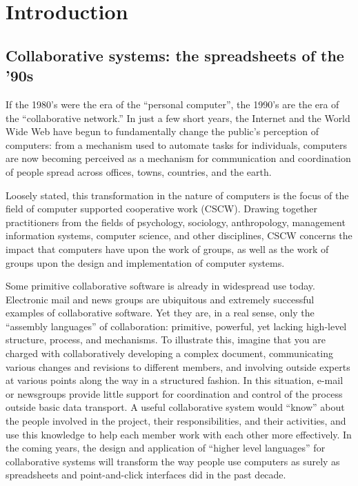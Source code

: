 
\chapter{Introduction}

\section{Collaborative systems: the spreadsheets of the '90s}

If the 1980's were the era of the ``personal computer'', the 1990's are the
era of the ``collaborative network.''  In just a few short years, the
Internet and the World Wide Web have begun to fundamentally change the
public's perception of computers: from a mechanism used to automate tasks
for individuals, computers are now becoming perceived as a mechanism for 
communication and coordination of people spread across offices,
towns, countries, and the earth.

Loosely stated, this transformation in the nature of computers is the focus
of the field of computer supported cooperative work (CSCW). Drawing
together practitioners from the fields of psychology, sociology,
anthropology, management information systems, computer science, and other
disciplines, CSCW concerns the impact that computers have upon the work of
groups, as well as the work of groups upon the design and implementation of
computer systems.  

Some primitive collaborative software is already in widespread use today.
Electronic mail and news groups are ubiquitous and extremely successful
examples of collaborative software.  Yet they are, in a real sense, only
the ``assembly languages'' of collaboration: primitive, powerful, yet
lacking high-level structure, process, and mechanisms.  To illustrate this,
imagine that you are charged with collaboratively developing a complex
document, communicating various changes and revisions to different members,
and involving outside experts at various points along the way in a
structured fashion. In this situation, e-mail or newsgroups provide little
support for coordination and control of the process outside basic data
transport. A useful collaborative system would ``know'' about the people
involved in the project, their responsibilities, and their activities, and
use this knowledge to help each member work with each other more
effectively.  In the coming years, the design and application of ``higher
level languages'' for collaborative systems will transform the way people
use computers as surely as spreadsheets and point-and-click interfaces did
in the past decade.

